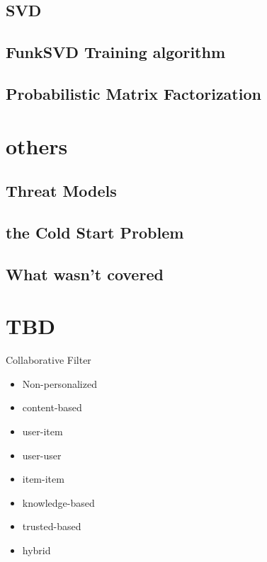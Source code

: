 \documentclass[fleqn,twoside]{article}
\begin{document}
\subsection{SVD}
\subsection{FunkSVD Training algorithm}
\subsection{Probabilistic Matrix Factorization}

\section{others}
\subsection{Threat Models}
\subsection{the Cold Start Problem}
\subsection{What wasn't covered}

\section{TBD}
Collaborative Filter
\begin{itemize}
\item Non-personalized 
\item content-based
\item user-item
\item user-user
\item item-item
\item knowledge-based
\item trusted-based
\item hybrid
\end{itemize}
\end{document}
